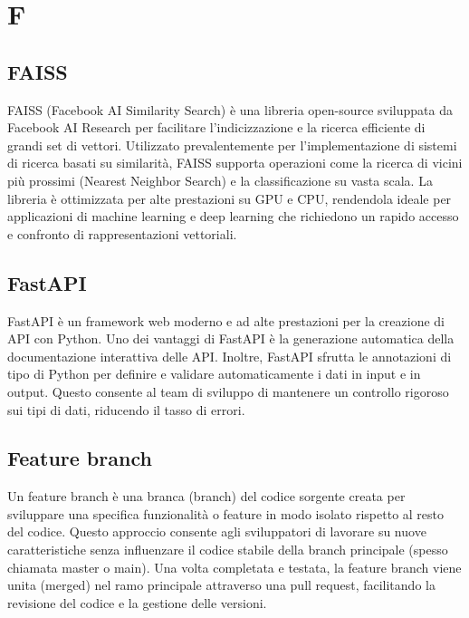 \section{F}

\vspace{2em}
\subsection*{FAISS}
\par FAISS (Facebook AI Similarity Search) è una libreria open-source sviluppata da Facebook AI Research per facilitare l'indicizzazione e la ricerca efficiente di grandi set di vettori. Utilizzato prevalentemente per l'implementazione di sistemi di ricerca basati su similarità, FAISS supporta operazioni come la ricerca di vicini più prossimi (Nearest Neighbor Search) e la classificazione su vasta scala. La libreria è ottimizzata per alte prestazioni su GPU e CPU, rendendola ideale per applicazioni di machine learning e deep learning che richiedono un rapido accesso e confronto di rappresentazioni vettoriali.

\vspace{2em}
\subsection*{FastAPI}
\par FastAPI è un framework web moderno e ad alte prestazioni per la creazione di API con Python. Uno dei vantaggi di FastAPI è la generazione automatica della documentazione interattiva delle API. Inoltre, FastAPI sfrutta le annotazioni di tipo di Python per definire e validare automaticamente i dati in input e in output. Questo consente al team di sviluppo di mantenere un controllo rigoroso sui tipi di dati, riducendo il tasso di errori.

\vspace{2em}
\subsection*{Feature branch}
\par Un feature branch è una branca (branch) del codice sorgente creata per sviluppare una specifica funzionalità o feature in modo isolato rispetto al resto del codice. Questo approccio consente agli sviluppatori di lavorare su nuove caratteristiche senza influenzare il codice stabile della branch principale (spesso chiamata master o main). Una volta completata e testata, la feature branch viene unita (merged) nel ramo principale attraverso una pull request, facilitando la revisione del codice e la gestione delle versioni.

